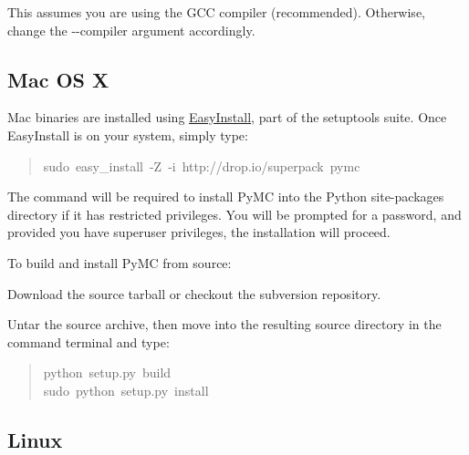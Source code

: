 This assumes you are using the GCC compiler (recommended). Otherwise, 
change the -{}-compiler argument accordingly.



\hypertarget{mac-os-x}{}
\subsection*{Mac OS X}

Mac binaries are installed using \href{http://peak.telecommunity.com/DevCenter/EasyInstall}{EasyInstall}, part of the setuptools suite. 
Once EasyInstall is on your system, simply type:
\begin{quote}{\ttfamily \raggedright \noindent
sudo~easy{\_}install~-Z~-i~http://drop.io/superpack~pymc
}\end{quote}

The  command will be required to install PyMC into the Python site-packages 
directory if it has restricted privileges. You will be prompted for a  password, and 
provided you have superuser privileges, the installation will proceed.

To build and install PyMC from source:
\begin{list}{.}
{
\setlength{\rightmargin}{\leftmargin}
}
\item {} 
Download the source tarball or checkout the subversion repository.

\item {} 
Untar the source archive, then move into the resulting source directory in
the command terminal and type:
\begin{quote}{\ttfamily \raggedright \noindent
python~setup.py~build~\\
sudo~python~setup.py~install
}\end{quote}

\end{list}



\hypertarget{linux}{}
\subsection*{Linux}

